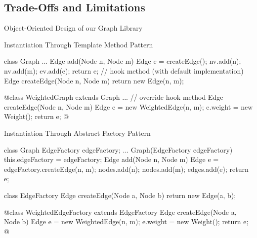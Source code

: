 \subsection{Trade-Offs and Limitations}

\begin{frame}{Object-Oriented Design of our Graph Library}
	\begin{mycolumns}[widths={40}]
	\mynextcolumn
	\end{mycolumns}
\end{frame}

\begin{frame}[fragile]{Instantiation Through Template Method Pattern}
	\small
	\begin{mycolumns}[widths={45}]
\begin{codetight}{}
class Graph {
	...
	Edge add(Node n, Node m) {
		Edge e = createEdge();
		nv.add(n); nv.add(m); ev.add(e);
		return e;
	}
	// hook method (with default implementation)
	Edge createEdge(Node n, Node m) {
		return new Edge(n, m);
	}
}
\end{codetight}
\begin{codetight}{}
@class WeightedGraph extends Graph {
	...
	// override hook method
	Edge createEdge(Node n, Node m) {
		Edge e = new WeightedEdge(n, m);
		e.weight = new Weight();
		return e;
	}
}@
\end{codetight}
	\mynextcolumn
		\centering{}
	\end{mycolumns}
\end{frame}

\begin{frame}[fragile]{Instantiation Through Abstract Factory Pattern}
	\small
	\begin{mycolumns}[b]
\begin{codetight}{}
class Graph {
	EdgeFactory edgeFactory;
	...
	Graph(EdgeFactory edgeFactory) {
		this.edgeFactory = edgeFactory;
	}
	Edge add(Node n, Node m) {
		Edge e = edgeFactory.createEdge(n, m);
		nodes.add(n); nodes.add(m); edges.add(e);
		return e;
	}
}
\end{codetight}
\begin{codetight}{}
class EdgeFactory {
	Edge createEdge(Node a, Node b) {
		return new Edge(a, b);
	}
}
\end{codetight}
	\mynextcolumn
		\centering{}	
\begin{codetight}{}
@class WeightedEdgeFactory extends EdgeFactory {
	Edge createEdge(Node a, Node b) {
		Edge e = new WeightedEdge(n, m);
		e.weight = new Weight();
		return e;
	}
}@
\end{codetight}
	\end{mycolumns}
\end{frame}

